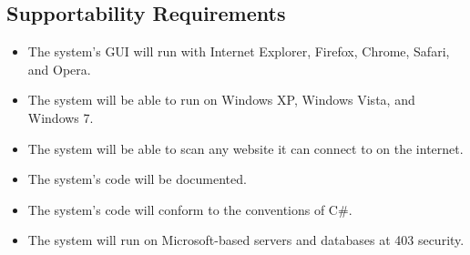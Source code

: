 \subsection{Supportability Requirements}
\begin{itemize}
\item The system's GUI will run with Internet Explorer, Firefox, Chrome, Safari, and Opera.
\item The system will be able to run on Windows XP, Windows Vista, and Windows 7.
\item The system will be able to scan any website it can connect to on the internet.
\item The system's code will be documented.
\item The system's code will conform to the conventions of C\#.
\item The system will run on Microsoft-based servers and databases at 403 security.
\end{itemize}
